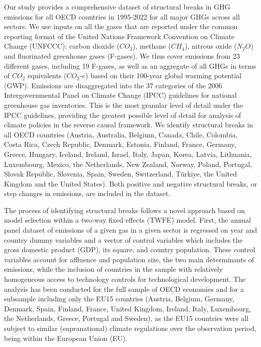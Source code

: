 \documentclass[a4paper]{article}
\begin{document}
Our study provides a comprehensive dataset of structural breaks in GHG emissions for all OECD countries in 1995-2022 for all major GHGs across all sectors. We use inputs on all the gases that are reported under the common reporting format of the United Nations Framework Convention on Climate Change (UNFCCC): carbon dioxide ($CO_2$), methane ($CH_4$), nitrous oxide ($N_2O$) and fluorinated greenhouse gases (F-gases). \cite{eggleston20062006} We thus cover emissions from 23 different gases, including 19 F-gases, as well as an aggregate of all GHGs in terms of $CO_2$ equivalents ($CO_2$-$e$) based on their 100-year global warming potential (GWP). Emissions are disaggregated into the 37 categories of the 2006 Intergovernmental Panel on Climate Change (IPCC) guidelines for national greenhouse gas inventories. \cite{eggleston20062006} This is the most granular level of detail under the IPCC guidelines, providing the greatest possible level of detail for analysis of climate policies in the reverse causal framework. We identify structural breaks in all OECD countries (Austria, Australia, Belgium, Canada, Chile, Colombia, Costa Rica, Czech Republic, Denmark, Estonia, Finland, France, Germany, Greece, Hungary, Iceland, Ireland, Israel, Italy, Japan, Korea, Latvia, Lithuania, Luxembourg, Mexico, the Netherlands, New Zealand, Norway, Poland, Portugal, Slovak Republic, Slovenia, Spain, Sweden, Switzerland, Türkiye, the United Kingdom and the United States). Both positive and negative structural breaks, or step changes in emissions, are included in the dataset.

The process of identifying structural breaks follows a novel approach based on model selection within a two-way fixed effects (TWFE) model. \cite{koch2022attributing} First, the annual panel dataset of emissions of a given gas in a given sector is regressed on year and country dummy variables and a vector of control variables which includes the gross domestic product (GDP), its square, and country population. These control variables account for affluence and population size, the two main determinants of emissions, \cite{hamilton2002determinants} while the inclusion of countries in the sample with relatively homogeneous access to technology controls for technological development. The analysis has been conducted for the full sample of OECD economies and for a subsample including only the EU15 countries (Austria, Belgium, Germany, Denmark, Spain, Finland, France, United Kingdom, Ireland, Italy, Luxembourg, the Netherlands, Greece, Portugal and Sweden), as the EU15 countries were all subject to similar (supranational) climate regulations over the observation period, being within the European Union (EU).
\end{document}
